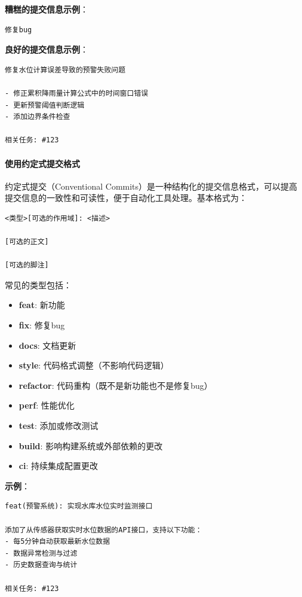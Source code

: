 \textbf{糟糕的提交信息示例}：

\begin{lstlisting}
修复bug
\end{lstlisting}

\textbf{良好的提交信息示例}：

\begin{lstlisting}
修复水位计算误差导致的预警失败问题

- 修正累积降雨量计算公式中的时间窗口错误
- 更新预警阈值判断逻辑
- 添加边界条件检查

相关任务: #123
\end{lstlisting}

\paragraph{使用约定式提交格式}\label{ux4f7fux7528ux7ea6ux5b9aux5f0fux63d0ux4ea4ux683cux5f0f}

约定式提交（Conventional
Commits）是一种结构化的提交信息格式，可以提高提交信息的一致性和可读性，便于自动化工具处理。基本格式为：

\begin{lstlisting}
<类型>[可选的作用域]: <描述>

[可选的正文]

[可选的脚注]
\end{lstlisting}

常见的类型包括：

\begin{itemize}
\tightlist
\item
  \textbf{feat}: 新功能
\item
  \textbf{fix}: 修复bug
\item
  \textbf{docs}: 文档更新
\item
  \textbf{style}: 代码格式调整（不影响代码逻辑）
\item
  \textbf{refactor}: 代码重构（既不是新功能也不是修复bug）
\item
  \textbf{perf}: 性能优化
\item
  \textbf{test}: 添加或修改测试
\item
  \textbf{build}: 影响构建系统或外部依赖的更改
\item
  \textbf{ci}: 持续集成配置更改
\end{itemize}

\textbf{示例}：

\begin{lstlisting}
feat(预警系统): 实现水库水位实时监测接口

添加了从传感器获取实时水位数据的API接口，支持以下功能：
- 每5分钟自动获取最新水位数据
- 数据异常检测与过滤
- 历史数据查询与统计

相关任务: #123
\end{lstlisting}

